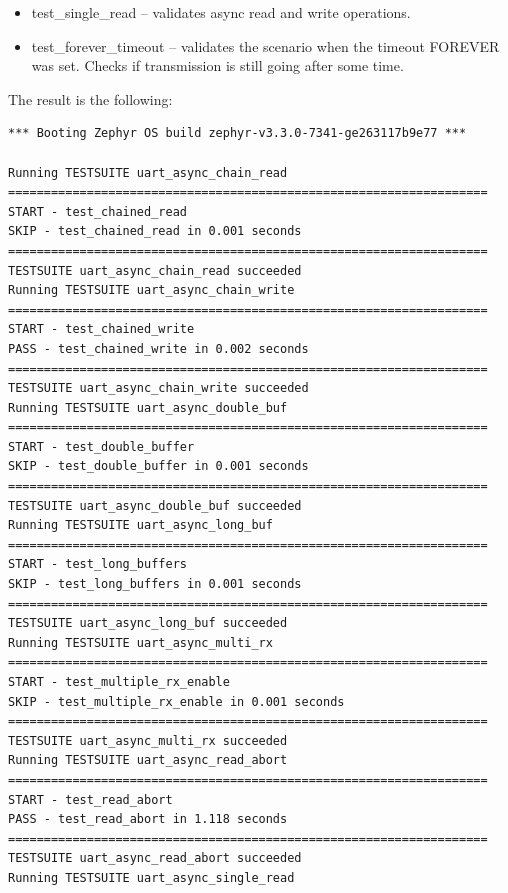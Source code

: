 \documentclass[11pt,a4paper,oneside]{article}
\begin{document}
\begin{itemize}
\item
  test\_single\_read -- validates async read and write operations.
\end{itemize}

\begin{itemize}
\item
  test\_forever\_timeout -- validates the scenario when the timeout
  FOREVER was set. Checks if transmission is still going after some
  time.
\end{itemize}

The result is the following:

\begin{lstlisting}
*** Booting Zephyr OS build zephyr-v3.3.0-7341-ge263117b9e77 ***

Running TESTSUITE uart_async_chain_read
===================================================================
START - test_chained_read
SKIP - test_chained_read in 0.001 seconds
===================================================================
TESTSUITE uart_async_chain_read succeeded
Running TESTSUITE uart_async_chain_write
===================================================================
START - test_chained_write
PASS - test_chained_write in 0.002 seconds
===================================================================
TESTSUITE uart_async_chain_write succeeded
Running TESTSUITE uart_async_double_buf
===================================================================
START - test_double_buffer
SKIP - test_double_buffer in 0.001 seconds
===================================================================
TESTSUITE uart_async_double_buf succeeded
Running TESTSUITE uart_async_long_buf
===================================================================
START - test_long_buffers
SKIP - test_long_buffers in 0.001 seconds
===================================================================
TESTSUITE uart_async_long_buf succeeded
Running TESTSUITE uart_async_multi_rx
===================================================================
START - test_multiple_rx_enable
SKIP - test_multiple_rx_enable in 0.001 seconds
===================================================================
TESTSUITE uart_async_multi_rx succeeded
Running TESTSUITE uart_async_read_abort
===================================================================
START - test_read_abort
PASS - test_read_abort in 1.118 seconds
===================================================================
TESTSUITE uart_async_read_abort succeeded
Running TESTSUITE uart_async_single_read

\end{lstlisting}
\end{document}
